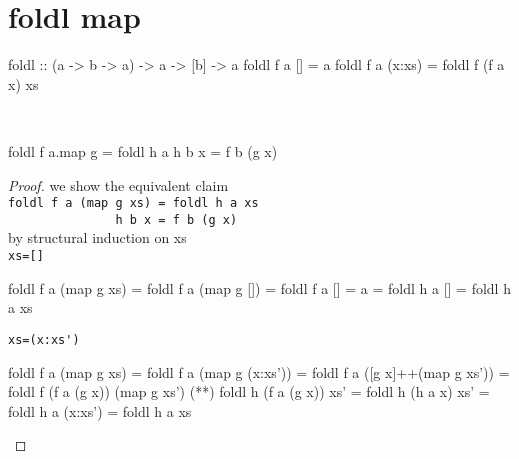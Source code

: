 \section{foldl map}
\begin{code}
foldl :: (a -> b -> a) -> a -> [b] -> a
foldl f a []     = a
foldl f a (x:xs) = foldl f (f a x) xs
\end{code}
\begin{claim}\ 
\begin{code}
foldl f a.map g = foldl h a
          h b x = f b (g x)
\end{code}
\end{claim}
\begin{proof}we show the equivalent claim \\
\verb|foldl f a (map g xs) = foldl h a xs|\\
\verb|               h b x = f b (g x)|\\
by structural induction on xs\\
\verb|xs=[]|
\begin{code}
foldl f a (map g xs) = foldl f a (map g [])
                     = foldl f a []
                     = a
                     = foldl h a []
                     = foldl h a xs
\end{code}
\verb|xs=(x:xs')|
\begin{code}
foldl f a (map g xs) = foldl f a (map g (x:xs'))
                     = foldl f a ([g x]++(map g xs'))
                     = foldl f (f a (g x)) (map g xs')
                     (**) foldl h (f a (g x)) xs'
                     = foldl h (h a x) xs'
                     = foldl h a (x:xs')
                     = foldl h a xs
\end{code}
\end{proof}